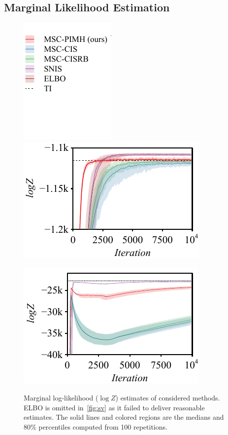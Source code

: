 \subsection{Marginal Likelihood Estimation}
%
\begin{figure}[H]
  \vspace{-0.1in}
  \centering
  \begin{minipage}[b]{0.17\linewidth}
    \centering
    \includegraphics[scale=0.75]{figures/radon_03.pdf}
  \end{minipage}
  \begin{minipage}[b]{0.35\linewidth}
    \centering
    \includegraphics[scale=0.7]{figures/radon_02.pdf}
  \end{minipage}
  \begin{minipage}[b]{0.35\linewidth}
    \centering
    \includegraphics[scale=0.7]{figures/sv_02.pdf}\label{fig:sv}
  \end{minipage}
  \caption{Marginal log-likelihood (\(\log Z\)) estimates of considered methods.
    ELBO is omitted in~\cref{fig:sv} as it failed to deliver reasonable estimates.
    The solid lines and colored regions are the medians and 80\% percentiles computed from 100 repetitions.
  }\label{fig:marginal_likelihood}
  \vspace{-0.15in}
\end{figure}
%

